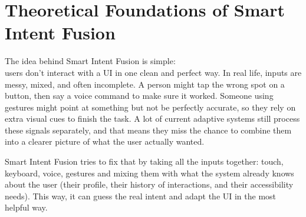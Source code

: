 \documentclass[openany]{book}
\begin{document}
\section{Theoretical Foundations of Smart Intent Fusion}
The idea behind Smart Intent Fusion is simple:
\\ users don’t interact with a UI in one clean and perfect way. In real life, inputs are messy, mixed, and often incomplete. A person might tap the wrong spot on a button, then say a voice command to make sure it worked. Someone using gestures might point at something but not be perfectly accurate, so they rely on extra visual cues to finish the task. A lot of current adaptive systems still process these signals separately, and that means they miss the chance to combine them into a clearer picture of what the user actually wanted.

Smart Intent Fusion tries to fix that by taking all the inputs together: touch, keyboard, voice, gestures and mixing them with what the system already knows about the user (their profile, their history of interactions, and their accessibility needs). This way, it can guess the real intent and adapt the UI in the most helpful way.
\end{document}
